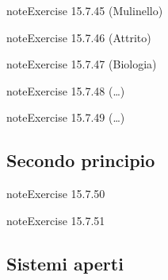 \documentclass[letterpaper,10pt,italian]{jupyterBook}
\begin{document}
\begin{sphinxadmonition}{note}{Exercise 15.7.45 (Mulinello)}


\end{sphinxadmonition}
 \label{exercise:ch/thermodynamics/principles-problems-exercise-45}

\begin{sphinxadmonition}{note}{Exercise 15.7.46 (Attrito)}


\end{sphinxadmonition}
 \label{exercise:ch/thermodynamics/principles-problems-exercise-46}

\begin{sphinxadmonition}{note}{Exercise 15.7.47 (Biologia)}


\end{sphinxadmonition}
 \label{exercise:ch/thermodynamics/principles-problems-exercise-47}

\begin{sphinxadmonition}{note}{Exercise 15.7.48 (…)}


\end{sphinxadmonition}
 \label{exercise:ch/thermodynamics/principles-problems-exercise-48}

\begin{sphinxadmonition}{note}{Exercise 15.7.49 (…)}


\end{sphinxadmonition}


\subsection{Secondo principio}
\label{\detokenize{ch/thermodynamics/principles-problems:secondo-principio}} \label{exercise:ch/thermodynamics/principles-problems-exercise-49}

\begin{sphinxadmonition}{note}{Exercise 15.7.50}


\end{sphinxadmonition}
 \label{exercise:ch/thermodynamics/principles-problems-exercise-50}

\begin{sphinxadmonition}{note}{Exercise 15.7.51}


\end{sphinxadmonition}


\subsection{Sistemi aperti}
\label{\detokenize{ch/thermodynamics/principles-problems:sistemi-aperti}} \label{exercise:ch/thermodynamics/principles-problems-exercise-51}
\end{document}
